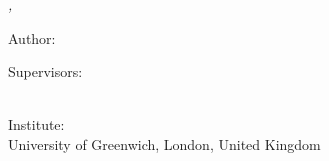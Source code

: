 \hfill
\vfill

\noindent \textit{\myTitle,} {\textcopyright} {\mySubmissionMonth} {\mySubmissionYear}

\bigskip

\noindent Author:\\
{\myFirstName} \textsc{\myLastName}

\medskip

\noindent Supervisors:\\
{\myProfTitle} {\myProfFirstName} \textsc{\myProfLastName}\\
{\myOtherProfTitle} {\myOtherProfFirstName} \textsc{\myOtherProfLastName}

\medskip

\noindent Institute:\\
University of Greenwich, London, United Kingdom

